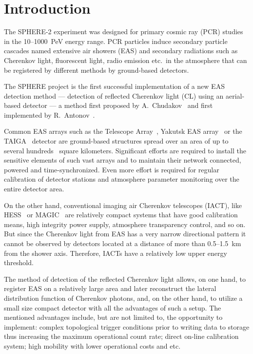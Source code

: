 \documentclass[final,5p,times,twocolumn]{elsarticle}
\begin{document}
\section{Introduction}
The SPHERE-2 experiment was designed for primary cosmic ray (PCR) studies in the 10--1000~PeV energy range. PCR particles induce secondary particle cascades named extensive air showers (EAS) and secondary radiations such as Cherenkov light, fluorescent light, radio emission etc.\ in the atmosphere that can be registered by different methods by ground-based detectors. 

The SPHERE project is the first successful implementation of a new EAS detection method --- detection of reflected Cherenkov light (CL) using an aerial-based detector --- a method first proposed by A.~Chudakov~\cite{chu74:VKKL74} and first implemented by R.~Antonov~\cite{ant75, ant86, ant97, Ant15a}.

Common EAS arrays such as the Telescope Array~\cite{abu12}, Yakutsk EAS array~\cite{Yakutsk19} or the TAIGA~\cite{TAIGA20} detector are ground-based structures spread over an area of up to several hundreds~\cite{abu12} square kilometers. Significant efforts are required to install the sensitive elements of such vast arrays and to maintain their network connected, powered and time-synchronized. Even more effort is required for regular calibration of detector stations and atmosphere parameter monitoring over the entire detector area. 

On the other hand, conventional imaging air Cherenkov telescopes (IACT), like HESS~\cite{HESS03a, HESS03b} or MAGIC~\cite{MAGIC16-1, MAGIC16-2} are relatively compact systems that have good calibration means, high integrity power supply, atmosphere transparency control, and so on. But since the Cherenkov light from EAS has a very narrow directional pattern it cannot be observed by detectors located at a distance of more than 0.5--1.5~km from the shower axis. Therefore, IACTs have a relatively low upper energy threshold.

The method of detection of the reflected Cherenkov light allows, on one hand, to register EAS on a relatively large area and later reconstruct the lateral distribution function of Cherenkov photons, and, on the other hand, to utilize a small size compact detector with all the advantages of such a setup. The mentioned advantages include, but are not limited to, the opportunity to implement: complex topological trigger conditions prior to writing data to storage thus increasing the maximum operational count rate; direct on-line calibration system; high mobility with lower operational costs and etc.
\end{document}
